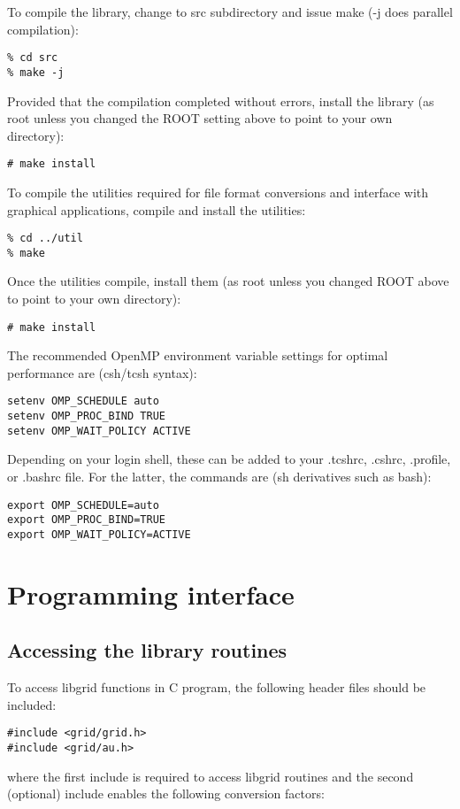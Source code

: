 \documentclass[12pt,letterpaper]{report}
\begin{document}
\noindent
To compile the library, change to src subdirectory and issue make (-j does parallel compilation):
\begin{verbatim}
% cd src
% make -j
\end{verbatim}
Provided that the compilation completed without errors, install the library (as root unless you changed the ROOT setting above to point to your own directory):
\begin{verbatim}
# make install
\end{verbatim}
To compile the utilities required for file format conversions and interface with graphical applications, compile and install the utilities:
\begin{verbatim}
% cd ../util
% make
\end{verbatim}
Once the utilities compile, install them (as root unless you changed ROOT above to point to your own directory):
\begin{verbatim}
# make install
\end{verbatim}

\noindent
The recommended OpenMP environment variable settings for optimal performance are (csh/tcsh syntax):
\begin{verbatim}
setenv OMP_SCHEDULE auto
setenv OMP_PROC_BIND TRUE
setenv OMP_WAIT_POLICY ACTIVE
\end{verbatim}
Depending on your login shell, these can be added to your .tcshrc, .cshrc, .profile, or .bashrc file. For the latter, the commands are (sh derivatives such as bash):
\begin{verbatim}
export OMP_SCHEDULE=auto
export OMP_PROC_BIND=TRUE
export OMP_WAIT_POLICY=ACTIVE
\end{verbatim}

\chapter{Programming interface}

\section{Accessing the library routines}

To access libgrid functions in C program, the following header files should be included:
\begin{verbatim}
#include <grid/grid.h>
#include <grid/au.h>
\end{verbatim}
where the first include is required to access libgrid routines and the second (optional) include enables the following conversion factors:\\
\end{document}
